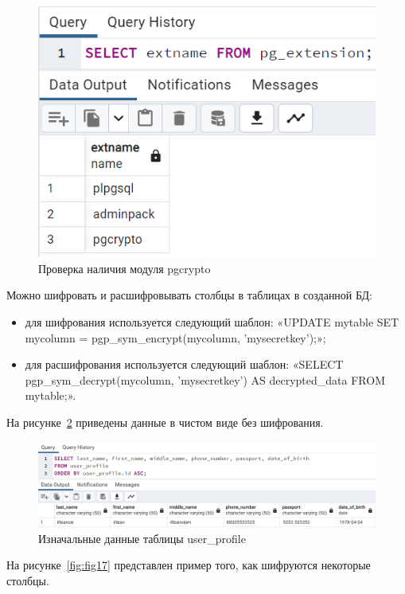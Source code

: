 \begin{figure}
  \includegraphics[scale=0.52]{inc/pgcrypto}
  \caption{Проверка наличия модуля pgcrypto}
  \label{fig:fig15}
\end{figure}

Можно шифровать и расшифровывать столбцы в таблицах в созданной БД:

\begin{itemize}
    \item для шифрования используется следующий шаблон: «UPDATE mytable SET mycolumn = pgp\_sym\_encrypt(mycolumn, 'mysecretkey');»;
    \item для расшифрования используется следующий шаблон: «SELECT pgp\_sym\_decrypt(mycolumn, 'mysecretkey') AS decrypted\_data FROM mytable;».
\end{itemize}

На рисунке~\ref{fig:fig16} приведены данные в чистом виде без шифрования.

\begin{figure}
  \includegraphics[scale=0.456]{inc/table_user_profile}
  \caption{Изначальные данные таблицы user\_profile}
  \label{fig:fig16}
\end{figure}

На рисунке~\ref{fig:fig17} представлен пример того, как шифруются некоторые столбцы.

